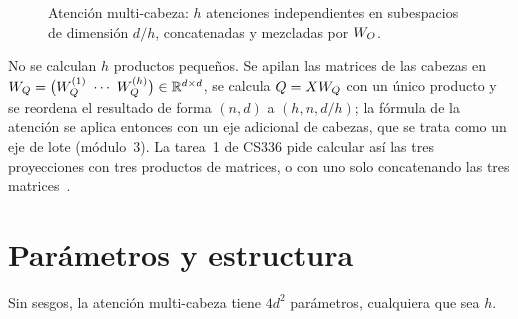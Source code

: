 \begin{figure}[h]
\centering
{}
\caption{Atención multi-cabeza: $h$ atenciones independientes en subespacios de dimensión $d/h$, concatenadas y mezcladas por $W_{O}$.}
\label{fig:mha}
\end{figure}

\begin{observacion}[Implementación]
No se calculan $h$ productos pequeños. Se apilan las matrices de las cabezas en $\WQ=\bigl(\WQ^{(1)}\ \cdots\ \WQ^{(h)}\bigr)\in\R^{d\times d}$, se calcula $Q=XW_{Q}$ con un único producto y se reordena el resultado de forma $(n,d)$ a $(h,n,d/h)$; la fórmula de la atención se aplica entonces con un eje adicional de cabezas, que se trata como un eje de lote (módulo~3). La tarea~1 de CS336 pide calcular así las tres proyecciones con tres productos de matrices, o con uno solo concatenando las tres matrices~\cite[§3.4.5]{cs336}.
\end{observacion}

\section{Parámetros y estructura}

\begin{proposicion}[Parámetros]\label{prop:param}
Sin sesgos, la atención multi-cabeza tiene $4d^{2}$ parámetros, cualquiera que sea $h$.
\end{proposicion}

